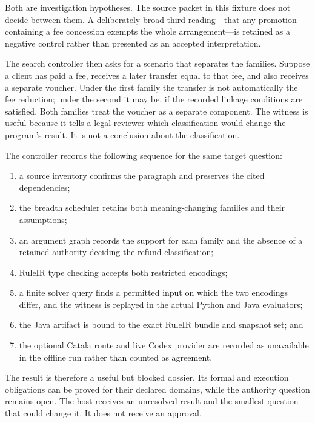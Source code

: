 \documentclass[12pt,a4paper,oneside,openany]{book}
\begin{document}
Both are investigation hypotheses. The source packet in this fixture does not
decide between them. A deliberately broad third reading---that any promotion
containing a fee concession exempts the whole arrangement---is retained as a
negative control rather than presented as an accepted interpretation.

The search controller then asks for a scenario that separates the families.
Suppose a client has paid a fee, receives a later transfer equal to that fee,
and also receives a separate voucher. Under the first family the transfer is
not automatically the fee reduction; under the second it may be, if the
recorded linkage conditions are satisfied. Both families treat the voucher as a
separate component. The witness is useful because it tells a legal reviewer
which classification would change the program's result. It is not a conclusion
about the classification.

The controller records the following sequence for the same target question:

\begin{enumerate}
\item a source inventory confirms the paragraph and preserves the cited
      dependencies;
\item the breadth scheduler retains both meaning-changing families and their
      assumptions;
\item an argument graph records the support for each family and the absence of
      a retained authority deciding the refund classification;
\item RuleIR type checking accepts both restricted encodings;
\item a finite solver query finds a permitted input on which the two encodings
      differ, and the witness is replayed in the actual Python and Java
      evaluators;
\item the Java artifact is bound to the exact RuleIR bundle and snapshot set;
      and
\item the optional Catala route and live Codex provider are recorded as
      unavailable in the offline run rather than counted as agreement.
\end{enumerate}

The result is therefore a useful but blocked dossier. Its formal and execution
obligations can be proved for their declared domains, while the authority
question remains open. The host receives an unresolved result and the smallest
question that could change it. It does not receive an approval.
\end{document}
